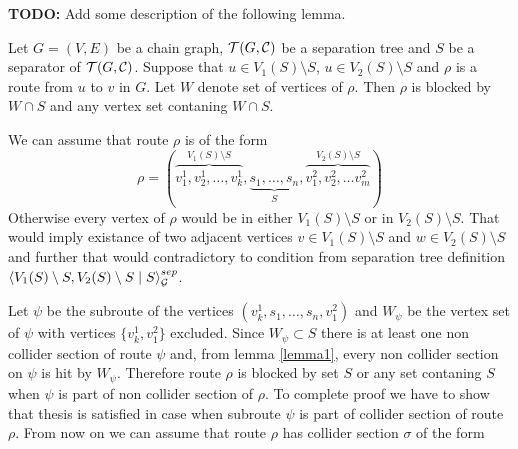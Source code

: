 %
%
%
%

\textbf{TODO:} Add some description of the following lemma.

\begin{lemma}
	Let $G = (V, E)$ be a chain graph, $\mathcal{T}(G, \mathcal{C})$ be a separation tree and $S$ be a separator of $\mathcal{T}(G, \mathcal{C})$.
	Suppose that $u \in V_1(S) \setminus S$, $u \in V_2(S) \setminus S$ and $\rho$ is a route from $u$ to $v$ in $G$. Let $W$ denote
	set of vertices of $\rho$. Then $\rho$ is blocked by $W \cap S$ and any vertex set contaning $W \cap S$.
\end{lemma}

\begin{prf}
	We can assume that route $\rho$ is of the form 
	\begin{equation}
		\rho = \left( 
				\overbrace{v^1_1, v^1_2, \dots, v^1_k}^{V_1(S) \setminus S}, 
				\underbrace{s_1, \dots, s_n}_{S}, 
				\overbrace{v^2_1, v^2_2, \dots v^2_m}^{V_2(S) \setminus S}  
			\right) 
	\end{equation}
	Otherwise every vertex of $\rho$ would be in either $V_1(S) \setminus S$ or in $V_2(S) \setminus S$. That would imply existance of
	two adjacent vertices $v \in V_1(S) \setminus S$ and $w \in V_2(S) \setminus S$ and further that would contradictory to condition from separation 
	tree definition $\left\langle V_1(S) \setminus S , V_2(S) \setminus S \mid S \right\rangle_{\mathcal{G}}^{sep}$.
	
	Let $\psi$ be the subroute of the vertices $(v^1_k, s_1, \dots, s_n, v^2_1)$ and $W_{\psi}$ be the vertex set of $\psi$ with vertices $\{v^1_k, v^2_1\}$
	excluded. Since $W_{\psi} \subset S$ there is at least one non collider section of route $\psi$ and, from lemma \ref{lemma1}, every non collider section on $\psi$
	is hit by $W_{\psi}$. Therefore route $\rho$ is blocked by set $S$ or any set contaning $S$ when $\psi$ is part of non collider section of $\rho$.
	To complete proof we have to show that thesis is satisfied in case when subroute $\psi$ is part of collider section of route $\rho$.
	From now on we can assume that route $\rho$ has collider section $\sigma$ of the form
	

\end{prf}
